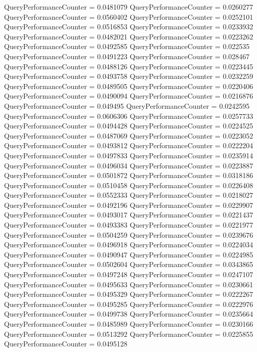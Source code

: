 \documentclass[9pt]{article}
\theoremstyle{plain}
\theoremstyle{definition}
\theoremstyle{remark}
\numberwithin{equation}{section}
\begin{document}
QueryPerformanceCounter  =  0.0481079
QueryPerformanceCounter  =  0.0260277
QueryPerformanceCounter  =  0.0560402
QueryPerformanceCounter  =  0.0252101
QueryPerformanceCounter  =  0.0516853
QueryPerformanceCounter  =  0.0233932
QueryPerformanceCounter  =  0.0482021
QueryPerformanceCounter  =  0.0223262
QueryPerformanceCounter  =  0.0492585
QueryPerformanceCounter  =  0.022535
QueryPerformanceCounter  =  0.0491223
QueryPerformanceCounter  =  0.028467
QueryPerformanceCounter  =  0.0488126
QueryPerformanceCounter  =  0.0223445
QueryPerformanceCounter  =  0.0493758
QueryPerformanceCounter  =  0.0232259
QueryPerformanceCounter  =  0.0489505
QueryPerformanceCounter  =  0.0220406
QueryPerformanceCounter  =  0.0490094
QueryPerformanceCounter  =  0.0216876
QueryPerformanceCounter  =  0.049495
QueryPerformanceCounter  =  0.0242595
QueryPerformanceCounter  =  0.0606306
QueryPerformanceCounter  =  0.0257733
QueryPerformanceCounter  =  0.0494428
QueryPerformanceCounter  =  0.0224525
QueryPerformanceCounter  =  0.0487069
QueryPerformanceCounter  =  0.0223052
QueryPerformanceCounter  =  0.0493812
QueryPerformanceCounter  =  0.0222204
QueryPerformanceCounter  =  0.0497833
QueryPerformanceCounter  =  0.0235914
QueryPerformanceCounter  =  0.0496034
QueryPerformanceCounter  =  0.0223887
QueryPerformanceCounter  =  0.0501872
QueryPerformanceCounter  =  0.0318186
QueryPerformanceCounter  =  0.0510458
QueryPerformanceCounter  =  0.0226408
QueryPerformanceCounter  =  0.0552333
QueryPerformanceCounter  =  0.0218027
QueryPerformanceCounter  =  0.0492196
QueryPerformanceCounter  =  0.0229907
QueryPerformanceCounter  =  0.0493017
QueryPerformanceCounter  =  0.0221437
QueryPerformanceCounter  =  0.0493383
QueryPerformanceCounter  =  0.0221977
QueryPerformanceCounter  =  0.0504259
QueryPerformanceCounter  =  0.0239676
QueryPerformanceCounter  =  0.0496918
QueryPerformanceCounter  =  0.0224034
QueryPerformanceCounter  =  0.0490947
QueryPerformanceCounter  =  0.0224985
QueryPerformanceCounter  =  0.0502604
QueryPerformanceCounter  =  0.0343865
QueryPerformanceCounter  =  0.0497248
QueryPerformanceCounter  =  0.0247107
QueryPerformanceCounter  =  0.0495633
QueryPerformanceCounter  =  0.0230661
QueryPerformanceCounter  =  0.0495329
QueryPerformanceCounter  =  0.0222267
QueryPerformanceCounter  =  0.0495285
QueryPerformanceCounter  =  0.0222976
QueryPerformanceCounter  =  0.0499738
QueryPerformanceCounter  =  0.0235664
QueryPerformanceCounter  =  0.0485989
QueryPerformanceCounter  =  0.0230166
QueryPerformanceCounter  =  0.0513292
QueryPerformanceCounter  =  0.0225855
QueryPerformanceCounter  =  0.0495128
\end{document}
